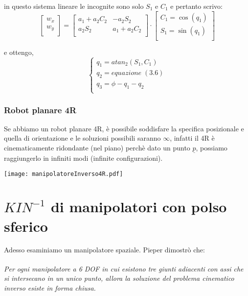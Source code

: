 in questo sistema lineare le incognite sono solo $S_1$ e $C_1$ e pertanto scrivo:
\begin{equation}
	\begin{bmatrix}
		w_x \\
		w_y \\
	\end{bmatrix}
	=
	\begin{bmatrix}
		a_1 + a_2C_2 & -a_2S_2 \\
		a_2S_2 & a_1 + a_2C_2 \\ 
	\end{bmatrix}
	\cdot
	\begin{bmatrix}
		C_1 = \cos(q_1) \\
		S_1 = \sin(q_1) \\
	\end{bmatrix}
\end{equation}

e ottengo,
\begin{equation}
	\begin{cases}
		q_1 = atan_2(S_1, C_1) \\
		q_2 = equazione\;(3.6) \\
		q_3 = \phi - q_1 - q_2 \\
	\end{cases}
\end{equation}
	
\subsubsection{Robot planare 4R}
Se abbiamo un robot planare 4R, è possibile soddisfare la specifica posizionale e quella di orientazione e le soluzioni possibili saranno $\infty$, infatti il 4R è cinematicamente ridondante (nel piano) perchè dato un punto $\underline{p}$, possiamo raggiungerlo in infiniti modi (infinite configurazioni).

\begin{center}
\texttt{[image: manipolatoreInverso4R.pdf]}
\end{center}

\section{$KIN^{-1}$ di manipolatori con polso sferico}
Adesso esaminiamo un manipolatore spaziale. Pieper dimostrò che:
\paragraph{}
\emph{Per ogni manipolatore a 6 DOF in cui esistono tre giunti adiacenti con assi che si intersecano in un unico punto, allora la soluzione del problema cinematico inverso esiste in forma chiusa.}
